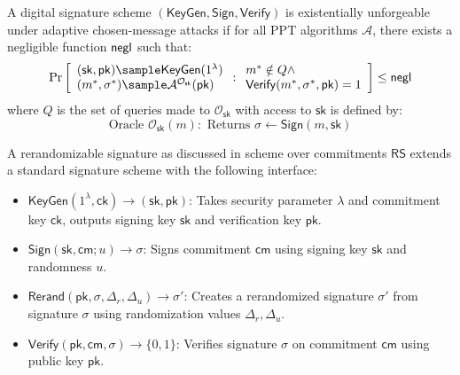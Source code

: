 \begin{definition}\label{def:euf-cma}
A digital signature scheme $(\mathsf{KeyGen}, \mathsf{Sign}, \mathsf{Verify})$ is existentially unforgeable \cite{DBLP:journals/siamcomp/GoldwasserMR88} under adaptive chosen-message attacks if for all PPT algorithms $\mathcal{A}$, there exists a negligible function $\mathsf{negl}$ such that: 
$$\Pr\left[\begin{array}{l}
    (\mathsf{sk}, \mathsf{pk}) \sample \mathsf{KeyGen}(1^\lambda) \\
    (m^*, \sigma^*) \sample \mathcal{A}^{\mathcal{O}_{\mathsf{sk}}}(\mathsf{pk})
\end{array} : \begin{array}{l}
    m^* \notin Q \land \\
    \mathsf{Verify}(m^*, \sigma^*, \mathsf{pk}) = 1
\end{array}\right] \leq \negl$$
where $Q$ is the set of queries made to $\mathcal{O}_{\mathsf{sk}}$ with access to $\mathsf{sk}$ is defined by:
\[
\text{Oracle }\mathcal{O}_{\mathsf{sk}}(m): \text{ Returns } \sigma \gets \mathsf{Sign}(m, \mathsf{sk})
\]
\end{definition}




\begin{definition}\label{def:rerandomizablesignature}
A rerandomizable signature as discussed in \cite{sako_short_2016} scheme over commitments $\mathsf{RS}$ extends a standard signature scheme with the following interface:
\begin{itemize}
    \item $\mathsf{KeyGen}(1^\lambda, \mathsf{ck}) \rightarrow (\mathsf{sk}, \mathsf{pk})$: Takes security parameter $\lambda$ and commitment key $\mathsf{ck}$, outputs signing key $\mathsf{sk}$ and verification key $\mathsf{pk}$.
    
    \item $\mathsf{Sign}(\mathsf{sk}, \mathsf{cm}; u) \rightarrow \sigma$: Signs commitment $\mathsf{cm}$ using signing key $\mathsf{sk}$ and randomness $u$.
    
    \item $\mathsf{Rerand}(\mathsf{pk}, \sigma, \Delta_r, \Delta_u) \rightarrow \sigma'$: Creates a rerandomized signature $\sigma'$ from signature $\sigma$ using randomization values $\Delta_r, \Delta_u$.
    
    \item $\mathsf{Verify}(\mathsf{pk}, \mathsf{cm}, \sigma) \rightarrow \{0,1\}$: Verifies signature $\sigma$ on commitment $\mathsf{cm}$ using public key $\mathsf{pk}$.
\end{itemize}
\end{definition}

